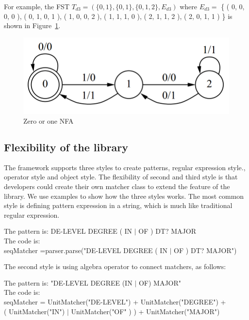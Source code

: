 For example, the FST $T_{d3} = \left(     \{ 0, 1 \} ,  \{ 0, 1 \} , \{ 0, 1 , 2 \} ,  E_{d3} \right ) $ where $E_{d3} = $ \{ ( 0, 0, 0, 0 ),   ( 0, 1, 0, 1 ), ( 1, 0, 0, 2 ), ( 1, 1, 1, 0 ), ( 2, 1, 1, 2 ), ( 2, 0, 1, 1 ) \}  is shown in Figure~\ref{fig:fst}.


\begin{figure}[htbp]
  \centering
  \includegraphics[scale=0.5]{images/fst.png}
  \caption{Zero or one NFA}
  \label{fig:fst}
\end{figure}


\subsection{Flexibility of the library}
The framework supports three styles to create patterns, regular expression style., operator style and  object style. The flexibility of second and third style is that developers could create their own matcher class to extend the feature of the library. We use examples to show how the three styles works. The most common style is defining pattern expression in a string, which is much like traditional regular expression.

\begin{framed}
\small
\noindent
The pattern is:  DE-LEVEL DEGREE ( IN  $\vert$  OF ) DT? MAJOR \\
The code is: \\
seqMatcher =parser.parse("DE-LEVEL DEGREE ( IN  $\vert$  OF ) DT? MAJOR")
 
\end{framed}

The second style is using algebra operator to connect matchers, as follows:
\begin{framed}
\small
\noindent
The pattern is:  "DE-LEVEL DEGREE (IN $\vert$ OF) MAJOR" \\
The code is: \\
seqMatcher =  UnitMatcher("DE-LEVEL") +  UnitMatcher("DEGREE") + \\
\hspace{3cm} ( UnitMatcher("IN") $\vert$ UnitMatcher("OF" ) ) + UnitMatcher("MAJOR")
 
\end{framed}

